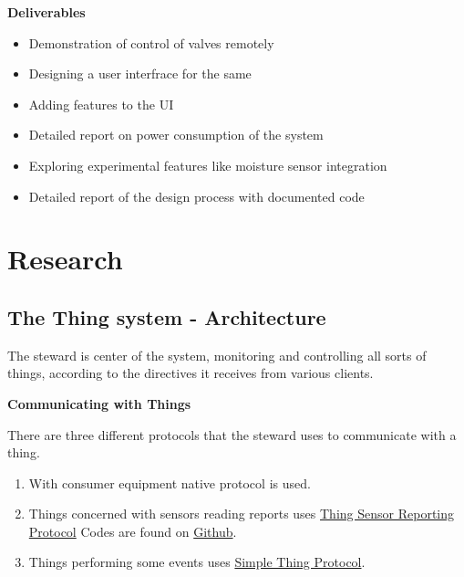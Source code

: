 \documentclass[16pt]{article}
\begin{document}
   \vspace{0.6cm}
   
  {\textbf{Deliverables}}
  
\begin{itemize}
\item Demonstration of control of valves remotely
\item Designing a user interfrace for the same 
\item Adding features to the UI 
\item Detailed report on power consumption of the system
\item Exploring experimental features like moisture sensor integration
\item Detailed report of the design process with documented code
\end{itemize}

\vspace{8cm}


  
\vspace{8cm}

\section{Research}
\vspace{0.5cm}



\subsection{The Thing system - Architecture}

\vspace{0.5cm}

The steward is center of the system, monitoring and controlling all
sorts of things, according to the directives it receives from various
clients.
\vspace{0.5cm}

{\Large{\textbf{Communicating with
Things}}}

There are three different protocols that the steward uses to communicate
with a thing. 

\begin{enumerate}


\item With consumer equipment native protocol is used.
\item Things concerned with sensors reading reports uses
{\color{red}\href{http://thethingsystem.com/dev/Thing-Sensor-Reporting-Protocol.html}{Thing Sensor Reporting Protocol}}
Codes are found on
{\color{red}\href{https://github.com/TheThingSystem/steward/tree/master/things/examples}{Github}}.
\item Things performing some events uses
{\color{red}\href{http://thethingsystem.com/dev/Simple-Thing-Protocol.html}{Simple Thing Protocol}}.

\end{enumerate}
\end{document}
